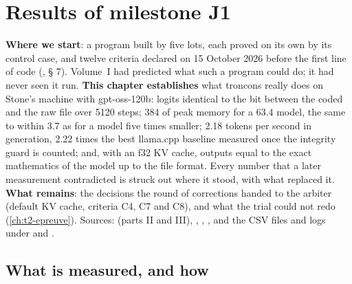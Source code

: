 \ifdefined\GrapheResVitesse\else\fi

\chapter{Results of milestone J1}\label{ch:t2-resultats}

\begin{origine}
\textbf{Where we start}: a program built by five lots, each proved on its own by its control case, and twelve criteria declared on 15 October 2026 before the first line of code (, § 7). Volume~I had predicted what such a program could do; it had never seen it run.
\textbf{This chapter establishes} what troncons really does on Stone's machine with gpt-oss-120b: logits identical to the bit between the coded and the raw file over \num{5120} steps; \SI{384}{\Mo} of peak memory for a \SI{63.4}{\Go} model, the same to within \SI{3.7}{\Mo} as for a model five times smaller; \num{2.18} tokens per second in generation, \num{2.22} times the best llama.cpp baseline measured once the integrity guard is counted; and, with an f32 KV cache, outputs equal to the exact mathematics of the model up to the file format. Every number that a later measurement contradicted is struck out where it stood, with what replaced it.
\textbf{What remains}: the decisions the round of corrections handed to the arbiter (default KV cache, criteria C4, C7 and C8), and what the trial could not redo (\cref{ch:t2-epreuve}).
Sources:  (parts II and III), , , , and the CSV files and logs under  and .
\end{origine}

\section{What is measured, and how}\label{t2res-sec:protocole}

